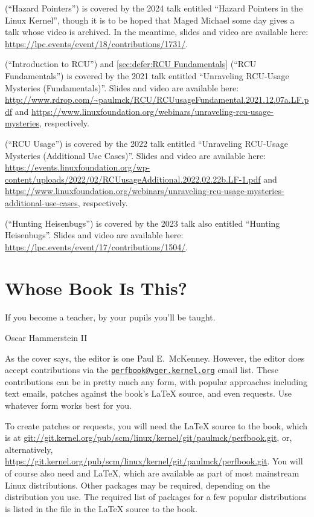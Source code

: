  (``Hazard Pointers'') is covered by
the 2024 talk entitled ``Hazard Pointers in the Linux Kernel'', though
it is to be hoped that Maged Michael some day gives a talk whose video
is archived.
In the meantime, slides and video are available here:
\url{https://lpc.events/event/18/contributions/1731/}.

 (``Introduction to RCU'')
and
\cref{sec:defer:RCU Fundamentals} (``RCU Fundamentals'')
is covered by the 2021 talk entitled ``Unraveling RCU-Usage Mysteries
(Fundamentals)''.
Slides and video are available here:
\url{http://www.rdrop.com/~paulmck/RCU/RCUusageFundamental.2021.12.07a.LF.pdf}
and
\url{https://www.linuxfoundation.org/webinars/unraveling-rcu-usage-mysteries},
respectively.

 (``RCU Usage'')
is covered by the 2022 talk entitled ``Unraveling RCU-Usage Mysteries
(Additional Use Cases)''.
Slides and video are available here:
\url{https://events.linuxfoundation.org/wp-content/uploads/2022/02/RCUusageAdditional.2022.02.22b.LF-1.pdf}
and
\url{https://www.linuxfoundation.org/webinars/unraveling-rcu-usage-mysteries-additional-use-cases},
respectively.

 (``Hunting Heisenbugs'')
is covered by the 2023 talk also entitled ``Hunting Heisenbugs''.
Slides and video are available here:
\url{https://lpc.events/event/17/contributions/1504/}.

\section{Whose Book Is This?}
\label{sec:howto:Whose Book Is This?}
%
\epigraph{If you become a teacher, by your pupils you'll be taught.}
	 {Oscar Hammerstein II}

As the cover says, the editor is one Paul E.~McKenney.
However, the editor does accept contributions via the
\href{mailto:perfbook@vger.kernel.org}
{\nolinkurl{perfbook@vger.kernel.org}} email list.
These contributions can be in pretty much any form, with popular
approaches including text emails,
patches against the book's \LaTeX{} source, and even  requests.
Use whatever form works best for you.

To create patches or  requests, you will need the
\LaTeX{} source to the book, which is at
\url{git://git.kernel.org/pub/scm/linux/kernel/git/paulmck/perfbook.git},
or, alternatively,
\url{https://git.kernel.org/pub/scm/linux/kernel/git/paulmck/perfbook.git}.
You will of course also need  and \LaTeX{}, which are
available as part of most mainstream Linux distributions.
Other packages may be required, depending on the distribution you use.
The required list of packages for a few popular distributions is listed
in the file  in the \LaTeX{} source to the book.

